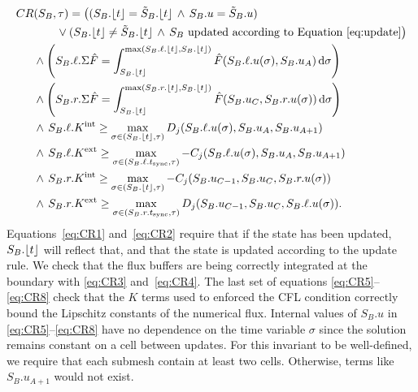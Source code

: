 \begin{align}
CR&(S_B,\tau) = \big( (S_B.\lfloor t \rfloor =\tilde{S}_B.\lfloor t \rfloor\,\land\,S_B.u = \tilde{S}_B.u) \label{eq:CR1}\\
&\quad\quad\lor (S_B.\lfloor t \rfloor \neq \tilde{S}_B.\lfloor t \rfloor \,\land\,S_B\text{ updated according to Equation~\eqref{eq:update}} \big)\label{eq:CR2}\\
&\land \left( S_B.\ell.\Sigma \hat{F} = \int_{S_B.\lfloor t \rfloor}^{\max(S_B.\ell.\lfloor t \rfloor,S_B.\lfloor t \rfloor)} \hat{F}(S_B.\ell.u(\sigma), S_B.u_A) \,\mathrm{d}\sigma \right)\label{eq:CR3}\\
&\land \left( S_B.r.\Sigma \hat{F} = \int_{S_B.\lfloor t \rfloor}^{\max(S_B.r.\lfloor t \rfloor,S_B.\lfloor t \rfloor)} \hat{F}(S_B.u_C, S_B.r.u(\sigma)) \,\mathrm{d}\sigma \right)\label{eq:CR4}\\
& \land\,S_B.\ell.K^{\text{int}} \ge \max_{\sigma \in (S_B.\lfloor t \rfloor, \tau)} D_j(S_B.\ell.u(\sigma), S_B.u_A, S_B.u_{A+1})\label{eq:CR5}\\
& \land\,S_B.\ell.K^{\text{ext}} \ge \max_{\sigma \in (S_B.\ell.t_{\text{sync}}, \tau)} -C_j(S_B.\ell.u(\sigma), S_B.u_A, S_B.u_{A+1})\label{eq:CR6}\\
& \land\,S_B.r.K^{\text{int}} \ge \max_{\sigma \in (S_B.\lfloor t \rfloor, \tau)} -C_j(S_B.u_{C-1}, S_B.u_C, S_B.r.u(\sigma))\label{eq:CR7}\\
& \land\,S_B.r.K^{\text{ext}} \ge \max_{\sigma \in (S_B.r.t_{\text{sync}}, \tau)} D_j(S_B.u_{C-1}, S_B.u_C, S_B.\ell.u(\sigma)).\label{eq:CR8}
\end{align}
 Equations~\eqref{eq:CR1} and~\eqref{eq:CR2} require that if the state has been updated, $S_B.\lfloor t \rfloor$ will reflect that, and that the state is updated according to the update rule. We check that the flux buffers are being correctly integrated at the boundary with \eqref{eq:CR3} and~\eqref{eq:CR4}. The last set of equations \eqref{eq:CR5}--\eqref{eq:CR8} check that the $K$ terms used to enforced the CFL condition correctly bound the Lipschitz constants of the numerical flux. Internal values of $S_B.u$ in \eqref{eq:CR5}--\eqref{eq:CR8} have no dependence on the time variable $\sigma$ since the solution remains constant on a cell between updates. For this invariant to be well-defined, we require that each submesh contain at least two cells. Otherwise, terms like $S_B.u_{A+1}$ would not exist.

